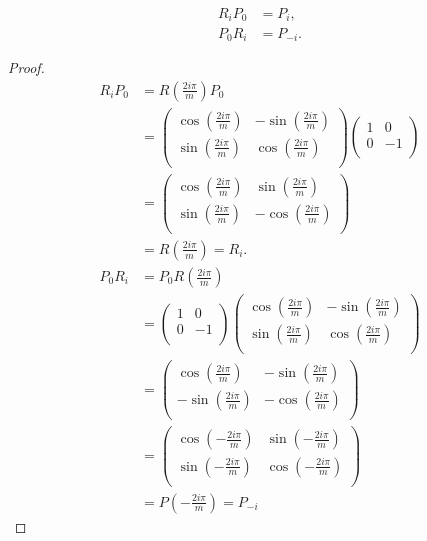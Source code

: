 \begin{lemma}
  \label{lem:i2m:rp=p:pr=p:}
  \begin{align*}
    R_iP_0&=P_i,\\
    P_0R_i &= P_{-i}.
  \end{align*}
\end{lemma}
\begin{proof}
  \begin{align*}
    R_iP_0
    &=R\left(\frac{2i\pi}{m}\right)
    P_0\\
  &=
  \begin{pmatrix}
    \cos(\frac{2i\pi}{m}) & -\sin(\frac{2i\pi}{m})\\
    \sin(\frac{2i\pi}{m}) & \cos(\frac{2i\pi}{m})\\
  \end{pmatrix}
  \begin{pmatrix}
    1 & 0\\
    0 & -1\\
  \end{pmatrix}\\
  &=
  \begin{pmatrix}
    \cos(\frac{2i\pi}{m}) & \sin(\frac{2i\pi}{m})\\
    \sin(\frac{2i\pi}{m}) & -\cos(\frac{2i\pi}{m})\\
  \end{pmatrix}\\
  &=R\left(\frac{2i\pi}{m}\right)=R_{i}.
  \end{align*}
  \begin{align*}
    P_0R_i
    &=P_0
    R\left(\frac{2i\pi}{m}\right)\\
  &=
  \begin{pmatrix}
    1 & 0\\
    0 & -1\\
  \end{pmatrix}
  \begin{pmatrix}
    \cos(\frac{2i\pi}{m}) & -\sin(\frac{2i\pi}{m})\\
    \sin(\frac{2i\pi}{m}) & \cos(\frac{2i\pi}{m})\\
  \end{pmatrix}\\
  &=
  \begin{pmatrix}
    \cos(\frac{2i\pi}{m}) & -\sin(\frac{2i\pi}{m})\\
    -\sin(\frac{2i\pi}{m}) & -\cos(\frac{2i\pi}{m})\\
  \end{pmatrix}\\
  &=
  \begin{pmatrix}
    \cos(-\frac{2i\pi}{m}) & \sin(-\frac{2i\pi}{m})\\
    \sin(-\frac{2i\pi}{m}) & \cos(-\frac{2i\pi}{m})\\
  \end{pmatrix}\\
  &=
  P\left(-\frac{2i\pi}{m}\right)
  =P_{-i}
  \end{align*}
\end{proof}

